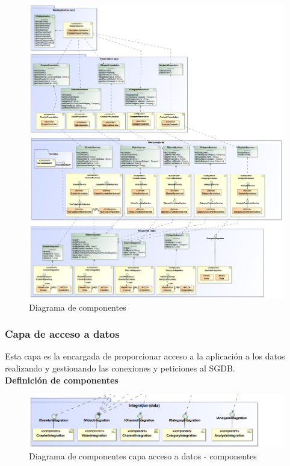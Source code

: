 \documentclass[11pt,a4paper]{article}
\begin{document}
\begin{figure}[H]
\centering
\includegraphics[scale=0.27]{diseno/ComponentDiagram3.png}
\caption{Diagrama de componentes}
\end{figure}
\newpage 

\subsubsection{Capa de acceso a datos}
Esta capa es la encargada de proporcionar acceso a la aplicación a los datos realizando y gestionando las conexiones y peticiones al SGDB.
\\


\noindent\textbf{Definición de componentes}
\begin{figure}[H]
\centering
\includegraphics[scale=0.35]{diseno/accesoDatos/ComponentsDiagram.png}
\caption{Diagrama de componentes capa acceso a datos - componentes}
\end{figure}
\end{document}
